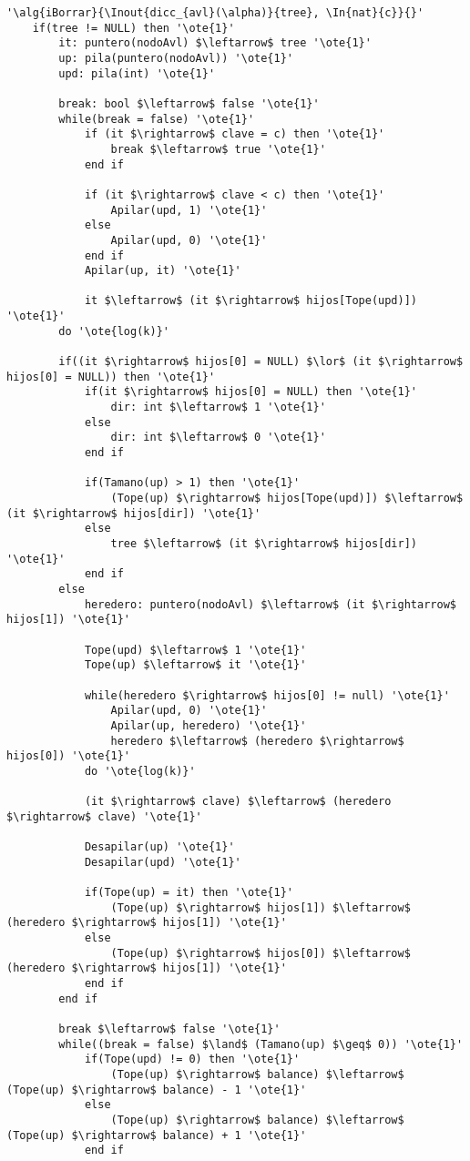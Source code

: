 \begin{lstlisting}[mathescape]
'\alg{iBorrar}{\Inout{dicc_{avl}(\alpha)}{tree}, \In{nat}{c}}{}'
	if(tree != NULL) then '\ote{1}'
		it: puntero(nodoAvl) $\leftarrow$ tree '\ote{1}'
		up: pila(puntero(nodoAvl)) '\ote{1}'
		upd: pila(int) '\ote{1}'

		break: bool $\leftarrow$ false '\ote{1}'
		while(break = false) '\ote{1}'
			if (it $\rightarrow$ clave = c) then '\ote{1}'
				break $\leftarrow$ true '\ote{1}'
			end if

			if (it $\rightarrow$ clave < c) then '\ote{1}'
				Apilar(upd, 1) '\ote{1}'
			else
				Apilar(upd, 0) '\ote{1}'
			end if
			Apilar(up, it) '\ote{1}'

			it $\leftarrow$ (it $\rightarrow$ hijos[Tope(upd)]) '\ote{1}'
		do '\ote{log(k)}'

		if((it $\rightarrow$ hijos[0] = NULL) $\lor$ (it $\rightarrow$ hijos[0] = NULL)) then '\ote{1}'
			if(it $\rightarrow$ hijos[0] = NULL) then '\ote{1}'
				dir: int $\leftarrow$ 1 '\ote{1}'
			else
				dir: int $\leftarrow$ 0 '\ote{1}'
			end if

			if(Tamano(up) > 1) then '\ote{1}'
				(Tope(up) $\rightarrow$ hijos[Tope(upd)]) $\leftarrow$ (it $\rightarrow$ hijos[dir]) '\ote{1}'
			else
				tree $\leftarrow$ (it $\rightarrow$ hijos[dir]) '\ote{1}'
			end if
		else
			heredero: puntero(nodoAvl) $\leftarrow$ (it $\rightarrow$ hijos[1]) '\ote{1}'

			Tope(upd) $\leftarrow$ 1 '\ote{1}'
			Tope(up) $\leftarrow$ it '\ote{1}'

			while(heredero $\rightarrow$ hijos[0] != null) '\ote{1}'
				Apilar(upd, 0) '\ote{1}'
				Apilar(up, heredero) '\ote{1}'
				heredero $\leftarrow$ (heredero $\rightarrow$ hijos[0]) '\ote{1}'
			do '\ote{log(k)}'

			(it $\rightarrow$ clave) $\leftarrow$ (heredero $\rightarrow$ clave) '\ote{1}'

			Desapilar(up) '\ote{1}'
			Desapilar(upd) '\ote{1}'

			if(Tope(up) = it) then '\ote{1}'
				(Tope(up) $\rightarrow$ hijos[1]) $\leftarrow$ (heredero $\rightarrow$ hijos[1]) '\ote{1}'
			else
				(Tope(up) $\rightarrow$ hijos[0]) $\leftarrow$ (heredero $\rightarrow$ hijos[1]) '\ote{1}'
			end if
		end if

		break $\leftarrow$ false '\ote{1}'
		while((break = false) $\land$ (Tamano(up) $\geq$ 0)) '\ote{1}'
			if(Tope(upd) != 0) then '\ote{1}'
				(Tope(up) $\rightarrow$ balance) $\leftarrow$ (Tope(up) $\rightarrow$ balance) - 1 '\ote{1}'
			else
				(Tope(up) $\rightarrow$ balance) $\leftarrow$ (Tope(up) $\rightarrow$ balance) + 1 '\ote{1}'
			end if


\end{lstlisting}
